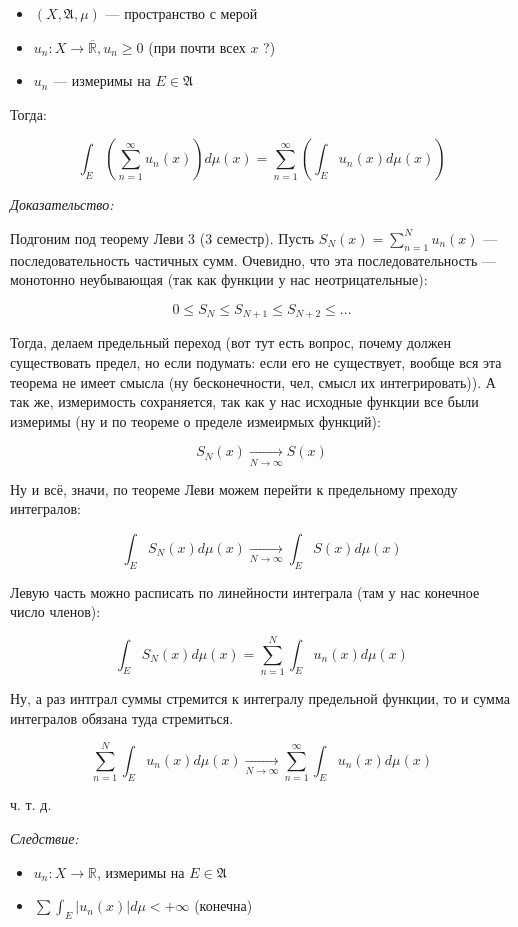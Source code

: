 \documentclass{article}
\def\rinf{\overline{\mathbb{R}}}
\def\goesto#1{\underset{#1}{\longrightarrow}}
\def\toinf#1{\goesto{#1 \rightarrow \infty}}
\begin{document}
\begin{itemize}
    \item $(X, \mathfrak{A}, \mu)$ --- пространство с мерой
    \item $u_n: X \rightarrow \rinf, u_n \ge 0$ (при почти всех $x$ ?)
    \item $u_n$ --- измеримы на $E \in \mathfrak{A}$
\end{itemize}

Тогда: 

\[\int_{E} \left(\sum_{n = 1}^{\infty} u_n(x)\right)d\mu(x) = \sum_{n = 1}^{\infty} \left(\int_{E} u_n(x) d\mu(x)\right)\]

\textit{Доказательство:}

Подгоним под теорему Леви 3 (3 семестр). Пусть $S_{N}(x) = \sum_{n = 1}^{N} u_n(x)$ --- последовательность частичных сумм. Очевидно, что эта последовательность --- монотонно неубывающая (так как функции у нас неотрицательные): 

\[0 \le S_{N} \le S_{N + 1} \le S_{N + 2} \le \ldots\]

Тогда, делаем предельный переход (вот тут есть вопрос, почему должен существовать предел, но если подумать: если его не существует, вообще вся эта теорема не имеет смысла (ну бесконечности, чел, смысл их интегрировать)). А так же, измеримость сохраняется, так как у нас исходные функции все были измеримы (ну и по теореме о пределе измеирмых функций): 

\[S_{N}(x) \toinf{N} S(x)\]

Ну и всё, значи, по теореме Леви можем перейти к предельному преходу интегралов: 

\[\int_{E} S_{N}(x) d\mu(x) \toinf{N} \int_{E} S(x) d\mu(x)\]

Левую часть можно расписать по линейности интеграла (там у нас конечное число членов): 

\[\int_{E} S_{N}(x) d\mu(x) = \sum_{n = 1}^{N} \int_{E} u_n(x) d\mu(x)\]

Ну, а раз интграл суммы стремится к интегралу предельной функции, то и сумма интегралов обязана туда стремиться.

\[\sum_{n = 1}^{N} \int_{E} u_n(x) d\mu(x) \toinf{N} \sum_{n = 1}^{\infty} \int_{E} u_n(x) d\mu(x)\]

ч. т. д. 


\textit{Следствие: }

\begin{itemize}
    \item $u_n: X \rightarrow \mathbb{R}$, измеримы на $E \in \mathfrak{A}$
    \item $\sum \int_{E} |u_n(x)| d\mu < +\infty$ (конечна)
\end{itemize}
\end{document}
